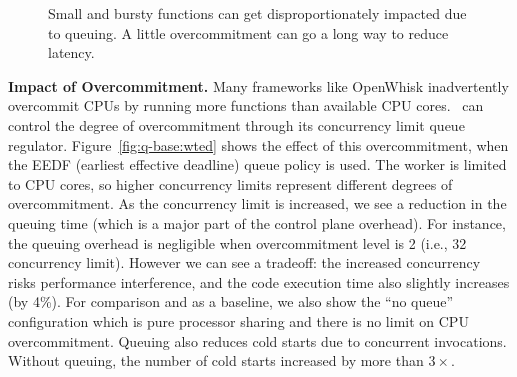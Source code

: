 \begin{figure}
  \centering
  \hfill
  \hfill
  \caption{Small and bursty functions can get disproportionately impacted due to queuing. A little overcommitment can go a long way to reduce latency.}
  \label{fig:q-burst}
\end{figure}


\noindent \textbf{Impact of Overcommitment.}
Many frameworks like OpenWhisk inadvertently overcommit CPUs by running more functions than available CPU cores.
\sysname~can control the degree of overcommitment through its concurrency limit queue regulator.
Figure~\ref{fig:q-base:wted} shows the effect of this overcommitment, when the EEDF (earliest effective deadline) queue policy is used. 
The worker is limited to CPU cores, so higher concurrency limits represent different degrees of overcommitment. 
As the concurrency limit is increased, we see a reduction in the queuing time (which is a major part of the control plane overhead).
For instance, the queuing overhead is negligible when overcommitment level is 2 (i.e., 32 concurrency limit).
However we can see a tradeoff: the increased concurrency risks performance interference, and the code execution time also slightly increases (by 4\%).
For comparison and as a baseline, we also show  the ``no queue'' configuration which is pure processor sharing and there is no limit on CPU overcommitment.
%
Queuing also reduces cold starts due to concurrent invocations. 
Without queuing, the number of cold starts increased by more than $3\times$. 



